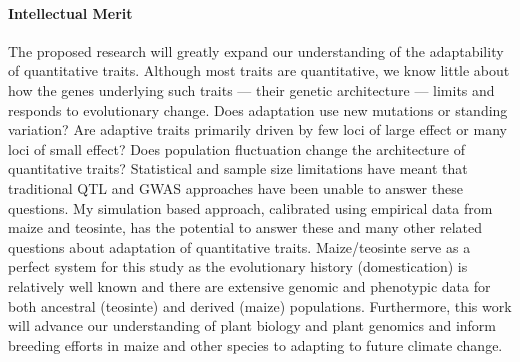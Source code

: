 \vspace{-0.4cm}

\paragraph{Intellectual Merit}  



The proposed research will greatly expand our understanding of the adaptability of quantitative traits. Although most traits are  quantitative, we know little about how the genes underlying such traits --- their genetic architecture --- limits and responds to evolutionary change. Does adaptation use new mutations or standing variation? Are adaptive traits primarily driven by few loci of large effect or many loci of small effect? Does population fluctuation change the architecture of quantitative traits? Statistical and sample size limitations have meant that traditional QTL and GWAS approaches have been unable to answer these questions. My simulation based approach, calibrated using empirical data from maize and teosinte, has the potential to answer these and many other related questions about adaptation of quantitative traits.  Maize\//teosinte  serve as a perfect system for this study as the evolutionary history (domestication) is relatively well known and there are extensive genomic and phenotypic data for both ancestral (teosinte) and derived (maize) populations. Furthermore, this work will advance our understanding of plant biology and plant genomics and inform breeding efforts in maize and other species to adapting to future climate change. 

